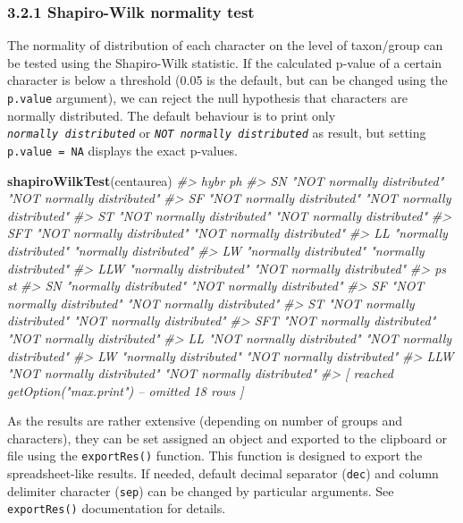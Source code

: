 \documentclass[
]{article}
\newenvironment{Shaded}{\begin{snugshade}}{\end{snugshade}}
\newcommand{\CommentTok}[1]{\textcolor[rgb]{0.56,0.35,0.01}{\textit{#1}}}
\newcommand{\KeywordTok}[1]{\textcolor[rgb]{0.13,0.29,0.53}{\textbf{#1}}}
\newcommand{\NormalTok}[1]{#1}
\begin{document}
\hypertarget{shapiro-wilk-normality-test}{%
\subsubsection{3.2.1 Shapiro-Wilk normality
test}\label{shapiro-wilk-normality-test}}

The normality of distribution of each character on the level of
taxon/group can be tested using the Shapiro-Wilk statistic. If the
calculated p-value of a certain character is below a threshold (0.05 is
the default, but can be changed using the \texttt{p.value} argument), we
can reject the null hypothesis that characters are normally distributed.
The default behaviour is to print only
\emph{\texttt{normally\ distributed}} or
\emph{\texttt{NOT\ normally\ distributed}} as result, but setting
\texttt{p.value\ =\ NA} displays the exact p-values.

\begin{Shaded}
\begin{Highlighting}[]
\KeywordTok{shapiroWilkTest}\NormalTok{(centaurea)}
\CommentTok{#>     hybr                       ph                        }
\CommentTok{#> SN  "NOT normally distributed" "NOT normally distributed"}
\CommentTok{#> SF  "NOT normally distributed" "NOT normally distributed"}
\CommentTok{#> ST  "NOT normally distributed" "NOT normally distributed"}
\CommentTok{#> SFT "NOT normally distributed" "NOT normally distributed"}
\CommentTok{#> LL  "normally distributed"     "normally distributed"    }
\CommentTok{#> LW  "normally distributed"     "normally distributed"    }
\CommentTok{#> LLW "normally distributed"     "NOT normally distributed"}
\CommentTok{#>     ps                         st                        }
\CommentTok{#> SN  "normally distributed"     "NOT normally distributed"}
\CommentTok{#> SF  "NOT normally distributed" "NOT normally distributed"}
\CommentTok{#> ST  "NOT normally distributed" "NOT normally distributed"}
\CommentTok{#> SFT "NOT normally distributed" "NOT normally distributed"}
\CommentTok{#> LL  "NOT normally distributed" "NOT normally distributed"}
\CommentTok{#> LW  "normally distributed"     "NOT normally distributed"}
\CommentTok{#> LLW "NOT normally distributed" "NOT normally distributed"}
\CommentTok{#>  [ reached getOption("max.print") -- omitted 18 rows ]}
\end{Highlighting}
\end{Shaded}

As the results are rather extensive (depending on number of groups and
characters), they can be set assigned an object and exported to the
clipboard or file using the \texttt{exportRes()} function. This function
is designed to export the spreadsheet-like results. If needed, default
decimal separator (\texttt{dec}) and column delimiter character
(\texttt{sep}) can be changed by particular arguments. See
\texttt{exportRes()} documentation for details.
\end{document}
